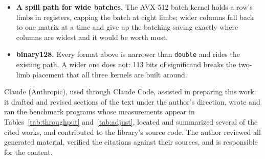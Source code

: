 \documentclass[acmsmall,screen,review]{acmart}
\newcommand{\code}[1]{\texttt{#1}}
\begin{document}
\begin{itemize}
\item \textbf{A spill path for wide batches.} The AVX-512 batch kernel holds a row's limbs in registers, capping the batch at eight limbs; wider columns fall back to one matrix at a time and give up the batching saving exactly where columns are widest and it would be worth most.
\item \textbf{binary128.} Every format above is narrower than \code{double} and rides the existing path. A wider one does not: 113 bits of significand breaks the two-limb placement that all three kernels are built around.
\end{itemize}

\begin{acks}
Claude (Anthropic), used through Claude Code, assisted in preparing this work: it drafted and revised sections of the text under the author's direction, wrote and ran the benchmark programs whose measurements appear in Tables~\ref{tab:throughput} and~\ref{tab:adjust}, located and summarized several of the cited works, and contributed to the library's source code. The author reviewed all generated material, verified the citations against their sources, and is responsible for the content.
\end{acks}



\end{document}
